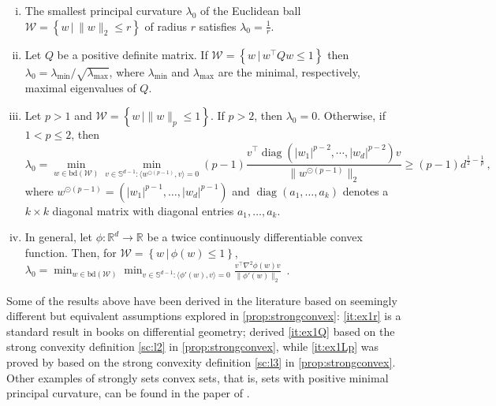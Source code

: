 \documentclass[english]{article}
\newcommand{\cW}{\mathcal{W}}
\newcommand{\seto}[1]{\left\{#1\right\}}
\newcommand{\R}{\mathbb{R}}
\newcommand{\bS}{\mathbb{S}}
\newcommand{\inpro}[2]{\langle #1, #2\rangle}
\newcommand{\set}[2]{\left\{#1 \,\vert\, #2 \right\}}
\newcommand{\bd}{\mathrm{bd}}
\DeclareMathOperator{\diag}{diag}
\begin{document}
\begin{example}
	\label{ex:curvature}
\begin{enumerate}[(i)]\setlength{\itemsep}{0pt}
\item \label{it:ex1r} The smallest principal curvature $\lambda_0$ of the Euclidean ball $\cW = \set{w}{\|w\|_2\le r}$ of radius $r$ 
satisfies $\lambda_0=\frac{1}{r}$.

\item \label{it:ex1Q} Let $Q$ be a positive definite matrix.
If $\cW = \set{w}{w^\top Q w\le 1 }$ then $\lambda_0=\lambda_{\min}/\sqrt{\lambda_{\max}}$, 
where $\lambda_{\min}$ and $\lambda_{\max}$ are the minimal, respectively, maximal eigenvalues of $Q$.

\item \label{it:ex1Lp} Let $p>1$ and $\cW = \seto{w\,\vert \|w\|_p\le1 }$. If $p>2$, then $\lambda_0 = 0$. Otherwise, if $1<p\le 2$, then 
$$\lambda_0 = \min_{w\in \bd(\cW)} \min_{v \in \bS^{d-1}:  \inpro{w^{\odot(p-1)}}{v}=0} (p-1)\frac{v^{\top} \diag\left(|w_1|^{p-2},\cdots,|w_d|^{p-2}\right) v }{\|w^{\odot(p-1)}\|_2}  \ge (p-1)d^{\frac{1}{2} - \frac{1}{p}}\,,$$
where $w^{\odot(p-1)}=(|w_1|^{p-1},\ldots,|w_d|^{p-1})$ and $\diag(a_1,\ldots,a_k)$ denotes a $k\times k$ diagonal matrix with diagonal entries $a_1,\ldots,a_k$.

\item \label{it:ex1gen} In general, let $\phi:\R^d \to \R$ be a twice continuously differentiable convex function.
Then, for $\cW = \set{w}{\phi(w)\le 1}$, 
$\lambda_0=\min_{w\in\bd(\cW)}\min_{v \in \bS^{d-1}:  \inpro{\phi'(w)}{v}=0} \frac{v^{\top}\nabla^2\phi(w) v}{\|\phi'(w)\|_2}$~. 
\end{enumerate}
\end{example}

Some of the results above have been derived in the literature based on seemingly different but equivalent assumptions explored in \cref{prop:strongconvex}:
 \eqref{it:ex1r} is a standard result in books on differential geometry; \citet{Pol96} derived \eqref{it:ex1Q} based on the strong convexity definition \eqref{sc:l2} in  \cref{prop:strongconvex}, while \eqref{it:ex1Lp} was proved by \citet{garber2014faster} based on the strong convexity definition \eqref{sc:l3} in  \cref{prop:strongconvex}. Other examples of strongly sets convex sets, that is, sets with positive minimal principal curvature, can be found in the paper of \citet{garber2014faster}.
 
\end{document}
